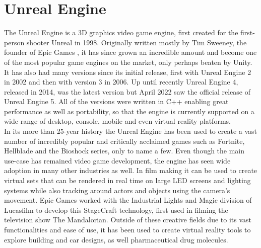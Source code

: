 \chapter{Unreal Engine}\label{chp:UnrealEngine}

The Unreal Engine is a 3D graphics video game engine, first created for the first-person shooter Unreal in 1998\cite{bib:UnrealFacts}. Originally written mostly by Tim Sweeney, the founder of Epic Games \cite{bib:TimSweeney}, it has since grown an incredible amount and become one of the most popular game engines on the market, only perhaps beaten by Unity\cite{bib:UnrealFacts}. It has also had many versions since its initial release, first with Unreal Engine 2 in 2002 and then with version 3 in 2006\cite{bib:UnrealFacts}. Up until recently Unreal Engine 4, released in 2014, was the latest version but April 2022 saw the official release of Unreal Engine 5. All of the versions were written in C++ enabling great performance as well as portability, so that the engine is currently supported on a wide range of desktop, console, mobile and even virtual reality platforms\cite{bib:UnrealFacts}.\\

In its more than 25-year history the Unreal Engine has been used to create a vast number of incredibly popular and critically acclaimed games such as Fortnite, Hellblade and the Bioshock series, only to name a few\cite{bib:UnrealGames}. Even though the main use-case has remained video game development, the engine has seen wide adoption in many other industries as well. In film making it can be used to create virtual sets that can be rendered in real time on large LED screens and lighting systems while also tracking around actors and objects using the camera's movement. Epic Games worked with the Industrial Lights and Magic division of Lucasfilm to develop this StageCraft technology, first used in filming the television show The Mandalorian\cite{bib:Mando}. Outside of these creative fields due to its vast functionalities and ease of use, it has been used to create virtual reality tools to explore building and car designs, as well pharmaceutical drug molecules\cite{bib:VRFields}.\\

